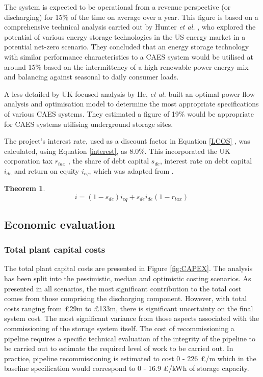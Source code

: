 \documentclass[preprint,12pt]{elsarticle}
\newtheorem{theorem}{Theorem}
\begin{document}
The system is expected to be operational from a revenue perspective (or discharging) for 15\% of the time on average over a year. This figure is based on a comprehensive technical analysis carried out by Hunter \textit{et al.} \cite{HUNTER20212077}, who explored the potential of various energy storage technologies in the US energy market in a potential net-zero scenario. They concluded that an energy storage technology with similar performance characteristics to a CAES system would be utilised at around 15\% based on the intermittency of a high renewable power energy mix and balancing against seasonal to daily consumer loads.

A less detailed by UK focused analysis by He, \textit{et al.} \cite{HE2021116097} built an optimal power flow analysis and optimisation model to determine the most appropriate specifications of various CAES systems. They estimated a figure of 19\% would be appropriate for CAES systems utilising underground storage sites.

The project’s interest rate, used as a discount factor in Equation \ref{LCOS} , was calculated, using Equation \ref{interest}, as 8.0\%. This incorporated the UK corporation tax $r_{tax}$ \cite{Tax2021}, the share of debt capital $s_{de}$, interest rate on debt capital $i_{de}$ and return on equity $i_{eq}$, which was adapted from \cite{Julch2015}.

\begin{theorem}
\begin{equation}
    i=\left(1-s_{de}\right) i_{eq}+s_{de} i_{de}\left(1-r_{tax}\right)\ 
    \label{interest}
\end{equation}
\end{theorem}

\subsection{Economic evaluation}
\label{sec:EconomicEvalution}
\subsubsection{Total plant capital costs}

The total plant capital costs are presented in Figure \ref{fig:CAPEX}. The analysis has been split into the pessimistic, median and optimistic costing scenarios. As presented in all scenarios, the most significant contribution to the total cost comes from those comprising the discharging component. However, with total costs ranging from £29m to £133m, there is significant uncertainty on the final system cost. The most significant variance from those aspects associated with the commissioning of the storage system itself. The cost of recommissioning a pipeline requires a specific technical evaluation of the integrity of the pipeline to be carried out to estimate the required level of work to be carried out. In practice, pipeline recommissioning is estimated to cost 0 - 226 £/m which in the baseline specification would correspond to 0 - 16.9 £/kWh of storage capacity.   
\end{document}
